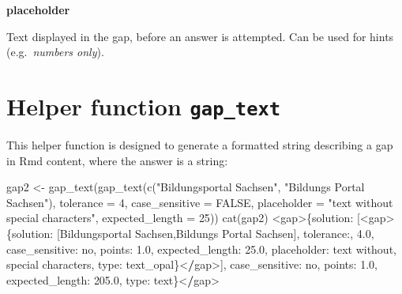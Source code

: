 \documentclass[twoside]{tufte-book}
\newenvironment{Shaded}{}{}
\newcommand{\AttributeTok}[1]{\textcolor[rgb]{0.49,0.56,0.16}{#1}}
\newcommand{\ConstantTok}[1]{\textcolor[rgb]{0.53,0.00,0.00}{#1}}
\newcommand{\DecValTok}[1]{\textcolor[rgb]{0.25,0.63,0.44}{#1}}
\newcommand{\ErrorTok}[1]{\textcolor[rgb]{1.00,0.00,0.00}{\textbf{#1}}}
\newcommand{\FloatTok}[1]{\textcolor[rgb]{0.25,0.63,0.44}{#1}}
\newcommand{\FunctionTok}[1]{\textcolor[rgb]{0.02,0.16,0.49}{#1}}
\newcommand{\NormalTok}[1]{#1}
\newcommand{\OtherTok}[1]{\textcolor[rgb]{0.00,0.44,0.13}{#1}}
\newcommand{\SpecialCharTok}[1]{\textcolor[rgb]{0.25,0.44,0.63}{#1}}
\newcommand{\StringTok}[1]{\textcolor[rgb]{0.25,0.44,0.63}{#1}}
\begin{document}
\noindent\textbf{placeholder}\label{placeholder}

Text displayed in the gap, before an answer is attempted. Can be used for hints (e.g.~\emph{numbers only}).

\section{\texorpdfstring{Helper function \texttt{gap\_text}}{Helper function gap\_text}}\label{gaptext}

This helper function is designed to generate a formatted string describing a gap in Rmd content, where the answer is a string:

\begin{Shaded}
\begin{Highlighting}[]
\NormalTok{gap2 }\OtherTok{\textless{}{-}} \FunctionTok{gap\_text}\NormalTok{(}\FunctionTok{gap\_text}\NormalTok{(}\FunctionTok{c}\NormalTok{(}\StringTok{"Bildungsportal Sachsen"}\NormalTok{, }\StringTok{"Bildungs Portal Sachsen"}\NormalTok{),}
                          \AttributeTok{tolerance =} \DecValTok{4}\NormalTok{, }\AttributeTok{case\_sensitive =} \ConstantTok{FALSE}\NormalTok{, }
                          \AttributeTok{placeholder =} \StringTok{"text without special characters"}\NormalTok{,}
                          \AttributeTok{expected\_length =} \DecValTok{25}\NormalTok{))}
\FunctionTok{cat}\NormalTok{(gap2)}
\SpecialCharTok{\textless{}}\NormalTok{gap}\SpecialCharTok{\textgreater{}}\NormalTok{\{solution}\SpecialCharTok{:}\NormalTok{ [}\SpecialCharTok{\textless{}}\NormalTok{gap}\SpecialCharTok{\textgreater{}}\NormalTok{\{solution}\SpecialCharTok{:}\NormalTok{ [Bildungsportal Sachsen,Bildungs Portal Sachsen], tolerance}\SpecialCharTok{:}\NormalTok{,   }\FloatTok{4.0}\NormalTok{, case\_sensitive}\SpecialCharTok{:}\NormalTok{ no, points}\SpecialCharTok{:} \FloatTok{1.0}\NormalTok{, expected\_length}\SpecialCharTok{:} \FloatTok{25.0}\NormalTok{, placeholder}\SpecialCharTok{:}\NormalTok{ text without,   special characters, type}\SpecialCharTok{:}\NormalTok{ text\_opal\}}\SpecialCharTok{\textless{}}\ErrorTok{/}\NormalTok{gap}\SpecialCharTok{\textgreater{}}\NormalTok{], case\_sensitive}\SpecialCharTok{:}\NormalTok{ no, points}\SpecialCharTok{:} \FloatTok{1.0}\NormalTok{, expected\_length}\SpecialCharTok{:} \FloatTok{205.0}\NormalTok{, type}\SpecialCharTok{:}\NormalTok{ text\}}\SpecialCharTok{\textless{}}\ErrorTok{/}\NormalTok{gap}\SpecialCharTok{\textgreater{}}
\end{Highlighting}
\end{Shaded}
\end{document}
